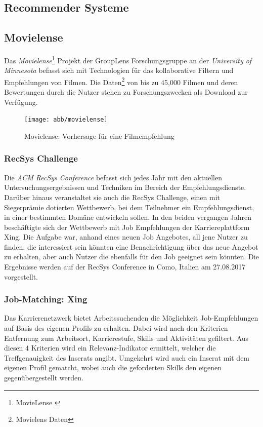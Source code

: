 \subsection{Recommender Systeme}

\subsection{Movielense}

Das \textit{Movielense}\footnote{MovieLense \cite{movielens}} Projekt der GroupLens Forschungsgruppe an der \emph{University of Minnesota} befasst sich mit Technologien für das kollaborative Filtern und Empfehlungen von Filmen. Die Daten\footnote{Movielens Daten\cite{grouplens_2016}} von bis zu 45,000 Filmen und deren Bewertungen durch die Nutzer stehen zu Forschungszwecken als Download zur Verfügung.

\begin{figure}[htb]
 \centering
 \texttt{[image: abb/movielense]}
 \caption[Beschreibung]{Movielense: Vorhersage für eine Filmempfehlung\cite{movielens_img}}
\label{fig:Filmempfehlung Movielense}
\end{figure}

\subsubsection{RecSys Challenge}

Die \textit{ACM RecSys Conference} befasst sich jedes Jahr mit den aktuellen Untersuchungsergebnissen und Techniken im Bereich der Empfehlungsdienste. Darüber hinaus veranstaltet sie auch die RecSys Challenge, einen mit  Siegerprämie dotierten Wettbewerb, bei dem Teilnehmer ein Empfehlungsdienst, in einer bestimmten Domäne entwickeln sollen. In den beiden vergangen Jahren beschäftigte sich der Wettbewerb mit Job Empfehlungen der Karriereplattform Xing. Die Aufgabe war, anhand eines neuen Job Angebotes, all jene Nutzer zu finden, die interessiert sein könnten eine Benachrichtigung über das neue Angebot zu erhalten, aber auch Nutzer die ebenfalls für den Job geeignet sein könnten. Die Ergebnisse werden auf der RecSys Conference in Como, Italien am 27.08.2017 vorgestellt.
\subsubsection{Job-Matching: Xing}

Das Karrierenetzwerk bietet Arbeitssuchenden die Möglichkeit Job-Empfehlungen auf Basis des eigenen Profils zu erhalten. Dabei wird nach den Kriterien Entfernung zum Arbeitsort, Karrierestufe, Skills und Aktivitäten gefiltert. Aus diesen 4 Kriterien wird ein Relevanz-Indikator ermittelt, welcher die Treffgenauigkeit des Inserats angibt. Umgekehrt wird auch ein Inserat mit dem eigenen Profil gematcht, wobei auch die geforderten Skills den eigenen gegenübergestellt werden.\cite{hoelscher}

